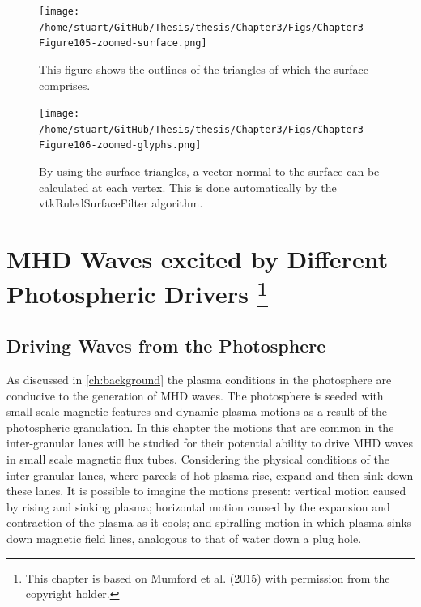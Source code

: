 \documentclass[a4paper,12pt,fourier,authoryear,custommargin]{Classes/PhDThesisPSnPDF}
\begin{document}
\begin{figure}[H]
    \centering
    \texttt{[image: /home/stuart/GitHub/Thesis/thesis/Chapter3/Figs/Chapter3-Figure105-zoomed-surface.png]}
    \caption{This figure shows the outlines of the triangles of which the surface comprises.}
    \label{fig:zoomed-surface}
\end{figure}

\begin{figure}[H]
    \centering
    \texttt{[image: /home/stuart/GitHub/Thesis/thesis/Chapter3/Figs/Chapter3-Figure106-zoomed-glyphs.png]}
    \caption{By using the surface triangles, a vector normal to the surface can be calculated at each vertex. This is done automatically by the vtkRuledSurfaceFilter algorithm.}
    \label{fig:zoomed-glyphs}
\end{figure}
\clearpage{}%
%

%
\clearpage{}%

\chapter[MHD Waves excited by Different Photospheric Drivers]{MHD Waves excited by Different Photospheric Drivers \footnote{This chapter is based on Mumford et al. (2015) with permission from the copyright holder.}}\label{ch:drivers}


\section{Driving Waves from the Photosphere}\label{sec:5drivers}

As discussed in \cref{ch:background} the plasma conditions in the photosphere are conducive to the generation of MHD waves.
The photosphere is seeded with small-scale magnetic features and dynamic plasma motions as a result of the photospheric granulation.
In this chapter the motions that are common in the inter-granular lanes will be studied for their potential ability to drive MHD waves in small scale magnetic flux tubes.
Considering the physical conditions of the inter-granular lanes, where parcels of hot plasma rise, expand and then sink down these lanes.
It is possible to imagine the motions present: vertical motion caused by rising and sinking plasma; horizontal motion caused by the expansion and contraction of the plasma as it cools; and spiralling motion in which plasma sinks down magnetic field lines, analogous to that of water down a plug hole.
\end{document}
